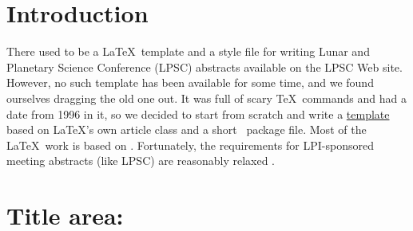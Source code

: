 \documentclass[twoside, 10pt]{article}
\begin{document}



%

%

\balance

\vspace{4cm}
\section*{Introduction}
There used to be a \LaTeX\ template and a style file for writing
Lunar and Planetary Science Conference (LPSC) abstracts available
on the LPSC Web site.  However, no such template has been available
for some time, and we found ourselves dragging the old one out.  It
was full of scary \TeX\ commands and had a date from 1996 in it,
so we decided to start from scratch and write a
\href{https://github.com/MosesAstro/LaTeX_Templates/tree/master/LPSCAbstractLaTeXTemplate}{template} based
on \LaTeX's own article class and a short \LaTeXe\ package file.
Most of the \LaTeX\ work is based on \cite{kopka2003guide}. Fortunately, the 
requirements for LPI-sponsored meeting abstracts (like LPSC)
are reasonably relaxed \citep{LPSC}.

\section*{Title area:}
\end{document}
